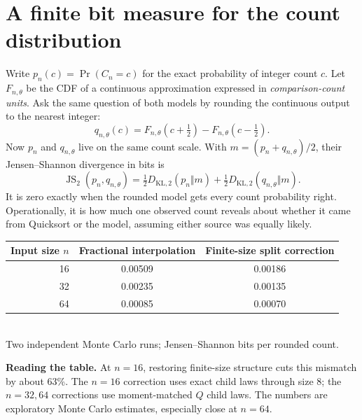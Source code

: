\documentclass[10pt]{article}
\begin{document}
\section*{A finite bit measure for the count distribution}
Write $p_n(c)=\Pr(C_n=c)$ for the exact probability of integer count $c$.
Let $F_{n,\theta}$ be the CDF of a continuous approximation expressed in
\emph{comparison-count units}. Ask the same question of both models by rounding
the continuous output to the nearest integer:
\begin{equation}
 q_{n,\theta}(c)
 =F_{n,\theta}(c+\tfrac12)-F_{n,\theta}(c-\tfrac12).
 \label{eq:rounding}
\end{equation}
Now $p_n$ and $q_{n,\theta}$ live on the same count scale. With
$m=(p_n+q_{n,\theta})/2$, their Jensen--Shannon divergence in bits is
\begin{equation}
 \operatorname{JS}_2(p_n,q_{n,\theta})
 =\tfrac12 D_{\mathrm{KL},2}(p_n\Vert m)
 +\tfrac12 D_{\mathrm{KL},2}(q_{n,\theta}\Vert m).
 \label{eq:js}
\end{equation}
It is zero exactly when the rounded model gets every count probability right.
Operationally, it is how much one observed count reveals about whether it came
from Quicksort or the model, assuming either source was equally likely.

\begin{center}
\begin{tabular}{@{}rcc@{}}
\toprule
Input size $n$ & Fractional interpolation & Finite-size split correction \\
\midrule
16 & 0.00509 & 0.00186 \\
32 & 0.00235 & 0.00135 \\
64 & 0.00085 & 0.00070 \\
\bottomrule
\end{tabular}\\[-1pt]
\small Two independent Monte Carlo runs; Jensen--Shannon bits per rounded count.
\end{center}

\textbf{Reading the table.} At $n=16$, restoring finite-size structure cuts this mismatch by about 63\%.
The $n=16$ correction uses exact child laws through size 8; the $n=32,64$
corrections use moment-matched $Q$ child laws. The numbers are exploratory
Monte Carlo estimates, especially close at $n=64$.
\end{document}
